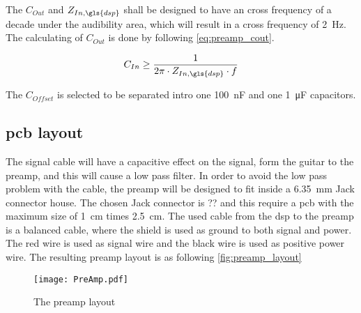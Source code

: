     The $C_{Out}$ and $Z_{In,\gls{dsp}}$ shall be designed to have an cross frequency of a decade under the audibility area, which will result in a cross frequency of \SI{2}{\hertz}. The calculating of $C_{Out}$ is done by following \autoref{eq:preamp_cout}.

\begin{equation}\label{eq:preamp_cout}
        C_{In} \geq  \frac{1}{2 \pi \cdot Z_{In,\gls{dsp}} \cdot f}
        \addunit{\si{\farad}}
    \end{equation}

    \startexplain
    \stopexplain
    
 The $C_{Offset}$ is selected to be separated intro one \SI{100}{\nano\farad} and one \SI{1}{\micro\farad} capacitors.
 
\subsection{\gls{pcb} layout} 
The signal cable will have a capacitive effect on the signal, form the guitar to the \gls{preamp}, and this will cause a low pass filter. In order to avoid the low pass problem with the cable, the \gls{preamp} will be designed to fit inside a \SI{6.35}{\milli\meter} Jack connector house. The chosen Jack connector is ?? and this require a \gls{pcb} with the maximum size of  \SI{1}{\centi\meter} times \SI{2.5}{\centi\meter}. The used cable from the \gls{dsp} to the \gls{preamp} is a balanced cable, where the shield is used as ground to both signal and power. The red wire is used as signal wire and the black wire is used as positive power wire. The resulting \gls{preamp} layout is as following \autoref{fig:preamp_layout}
 
 \begin{figure}[h]
	\centering
		\texttt{[image: PreAmp.pdf]}
		\caption{The \gls{preamp} layout}
		\label{fig:preamp_layout}
\end{figure}
 